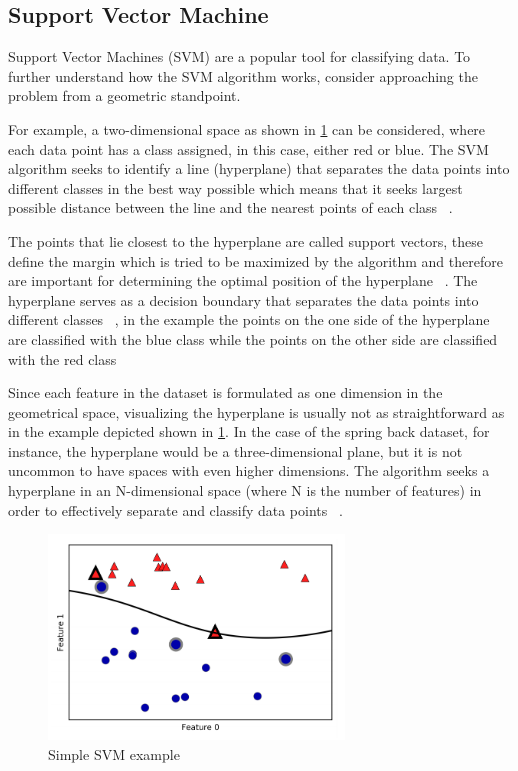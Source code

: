 \subsection{Support Vector Machine}\label{subsec:support-vector-regression-(svr)}
Support Vector Machines (SVM) are a popular tool for classifying data.
To further understand how the SVM algorithm works, consider approaching the problem from a geometric standpoint.

For example, a two-dimensional space as shown in \cref{fig:svm-example} can be considered, where each data point
has a class assigned, in this case, either red or blue.
The SVM algorithm seeks to identify a line (hyperplane) that separates the data points into different classes in the
best way possible which means that it seeks largest possible distance between the line and the
nearest points of each class
~\cite[pp. 92--96]{muller2016introduction}.

The points that lie closest to the hyperplane are called support vectors, these define the margin which is tried to be
maximized by the algorithm and therefore are important for determining the optimal position of the hyperplane
~\cite[p. 42]{awad2015efficient}.
The hyperplane serves as a decision boundary that separates the data points into different
classes~\cite[p. 11]{awad2015efficient}
, in the example the points on the one side of the hyperplane are classified with the blue class while the
points on the other side are classified with the red class

Since each feature in the dataset is formulated as one dimension in the geometrical space, visualizing the hyperplane
is usually not as straightforward as in the example depicted shown in \cref{fig:svm-example}.
In the case of the spring back dataset, for instance, the hyperplane would be a three-dimensional plane, but it is
not uncommon to have spaces with even higher dimensions.
The algorithm seeks a hyperplane in an N-dimensional space (where N is the number of features) in order to
effectively separate and classify data points
~\cite[]{awad2015efficient}.

\begin{figure}[H]
    \begin{tcolorbox}[arc=0pt,boxrule=0.5pt, colback=white]
        \centering
        \includegraphics[width=0.7\textwidth]{chap4/images/svm_example}
    \end{tcolorbox}
    \caption{Simple \ac{SVM} example~\cite[p. 94]{muller2016introduction}}
    \label{fig:svm-example}
\end{figure}

